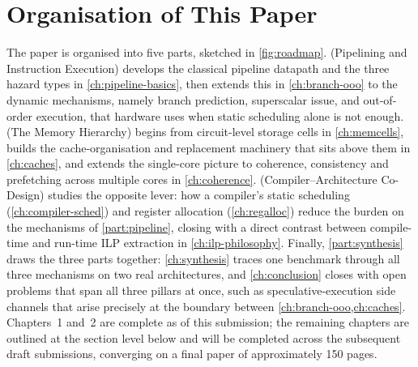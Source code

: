 \documentclass[11pt,a4paper]{report}
\begin{document}
\section{Organisation of This Paper}
\label{sec:organisation}

The paper is organised into five parts, sketched in \cref{fig:roadmap}.
 (Pipelining and Instruction Execution) develops the
classical pipeline datapath and the three hazard types in
\cref{ch:pipeline-basics}, then extends this in \cref{ch:branch-ooo} to
the dynamic mechanisms, namely branch prediction, superscalar issue, and
out-of-order execution, that hardware uses when static scheduling alone
is not enough.  (The Memory Hierarchy) begins from
circuit-level storage cells in \cref{ch:memcells}, builds the
cache-organisation and replacement machinery that sits above them in
\cref{ch:caches}, and extends the single-core picture to coherence,
consistency and prefetching across multiple cores in \cref{ch:coherence}.
 (Compiler--Architecture Co-Design) studies the
opposite lever: how a compiler's static scheduling
(\cref{ch:compiler-sched}) and register allocation
(\cref{ch:regalloc}) reduce the burden on the mechanisms of
\cref{part:pipeline}, closing with a direct contrast between compile-time
and run-time ILP extraction in \cref{ch:ilp-philosophy}. Finally,
\cref{part:synthesis} draws the three parts together: \cref{ch:synthesis}
traces one benchmark through all three mechanisms on two real
architectures, and \cref{ch:conclusion} closes with open problems that
span all three pillars at once, such as speculative-execution side
channels that arise precisely at the boundary between
\cref{ch:branch-ooo,ch:caches}. Chapters~1 and~2 are complete as of this
submission; the remaining chapters are outlined at the section level
below and will be completed across the subsequent draft submissions,
converging on a final paper of approximately 150 pages.
\end{document}
